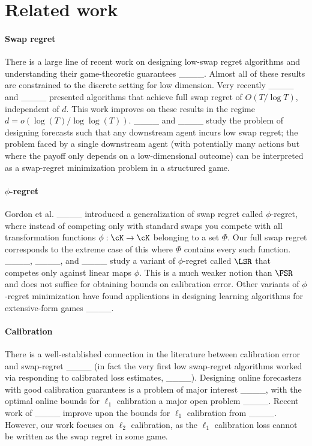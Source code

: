 \section{Related work}
\paragraph{Swap regret} There is a large line of recent work on designing low-swap regret algorithms and understanding their game-theoretic guarantees ____. Almost all of these results are constrained to the discrete setting for low dimension. Very recently  ____ and ____ presented algorithms that achieve full swap regret of $O(T/\log T)$, independent of $d$. This work improves on these results in the regime $d = o(\log(T)/\log\log(T))$. ____ and ____ study the problem of designing forecasts such that any downstream agent incurs low swap regret; the problem faced by a single downstream agent (with potentially many actions but where the payoff only depends on a low-dimensional outcome) can be interpreted as a swap-regret minimization problem in a structured game. 

\paragraph{$\phi$-regret} Gordon et al. ____ introduced a generalization of swap regret called $\phi$-regret, where instead of competing only with standard swaps you compete with all transformation functions $\phi:\cK\rightarrow \cK$ belonging to a set $\Phi$. Our full swap regret corresponds to the extreme case of this where $\Phi$ contains every such function. ____, ____, and ____ study a variant of $\phi$-regret called $\LSR$ that competes only against linear maps $\phi$. This is a much weaker notion than $\FSR$ and does not suffice for obtaining bounds on calibration error.  Other variants of $\phi$-regret minimization have found applications in designing learning algorithms for extensive-form games ____. 

\paragraph{Calibration} There is a well-established connection in the literature between calibration error and swap-regret ____ (in fact the very first low swap-regret algorithms worked via responding to calibrated loss estimates, ____). Designing online forecasters with good calibration guarantees is a problem of major interest ____, with the optimal online bounds for $\ell_1$ calibration a major open problem ____. Recent work of ____ improve upon the bounds for $\ell_1$ calibration from ____. However, our work focuses on $\ell_2$ calibration, as the $\ell_1$ calibration loss cannot be written as the swap regret in some game. 

